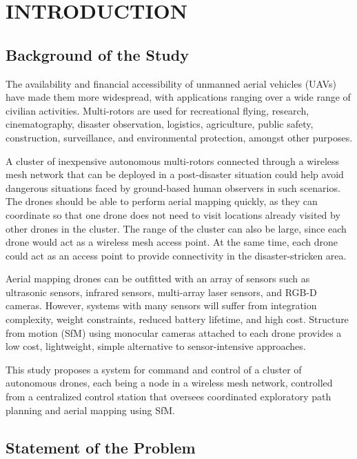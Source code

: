 \setlength{\parindent}{0.5in} 
\setlength{\parskip}{0mm}
\setlength{\baselineskip}{1.6em}

\chapter{INTRODUCTION} 

\section{Background of the Study}

The availability and financial accessibility of unmanned aerial vehicles (UAVs) have made them more widespread, with applications ranging over a wide range of civilian activities. Multi-rotors are used for recreational flying, research, cinematography, disaster observation, logistics, agriculture,  public safety, construction, surveillance, and environmental protection, amongst other purposes. 

A cluster of inexpensive autonomous multi-rotors connected through a wireless mesh network that can be deployed in a post-disaster situation could help avoid dangerous situations faced by ground-based human observers in such scenarios. The drones should be able to perform aerial mapping quickly, as they can coordinate so that one drone does not need to visit locations already visited by other drones in the cluster. The range of the cluster can also be large, since each drone would act as a wireless mesh access point. At the same time, each drone could act as an access point to provide connectivity in the disaster-stricken area.  

Aerial mapping drones can be outfitted with an array of sensors such as ultrasonic sensors, infrared sensors, multi-array laser sensors, and RGB-D cameras. However, systems with many sensors will suffer from integration complexity, weight constraints, reduced battery lifetime, and high cost. Structure from motion (SfM) using monocular cameras attached to each drone provides a low cost, lightweight, simple alternative to sensor-intensive approaches. 

This study proposes a system for command and control of a cluster of autonomous drones, each being a node in a wireless mesh network, controlled from a centralized control station that oversees coordinated exploratory path planning and aerial mapping using SfM.

\section{Statement of the Problem}

